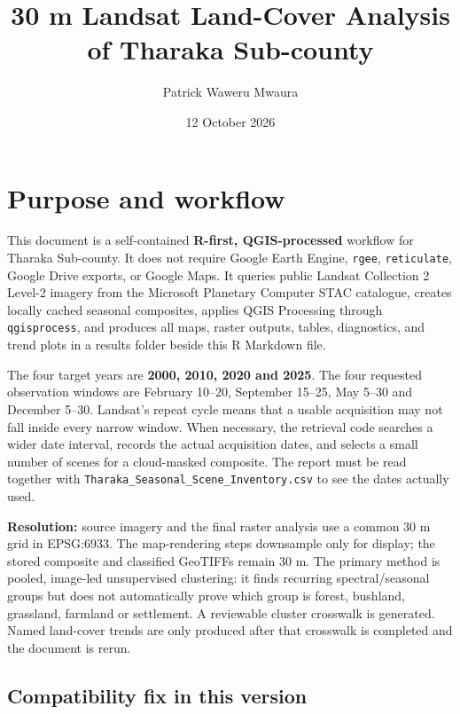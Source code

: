 \documentclass[
]{article}
\title{30 m Landsat Land-Cover Analysis of Tharaka Sub-county}
\author{Patrick Waweru Mwaura}
\date{12 October 2026}
\begin{document}
\maketitle

{
\setcounter{tocdepth}{2}
\tableofcontents
}
\section{Purpose and workflow}\label{purpose-and-workflow}

This document is a self-contained \textbf{R-first, QGIS-processed}
workflow for Tharaka Sub-county. It does not require Google Earth
Engine, \texttt{rgee}, \texttt{reticulate}, Google Drive exports, or
Google Maps. It queries public Landsat Collection 2 Level-2 imagery from
the Microsoft Planetary Computer STAC catalogue, creates locally cached
seasonal composites, applies QGIS Processing through
\texttt{qgisprocess}, and produces all maps, raster outputs, tables,
diagnostics, and trend plots in a results folder beside this R Markdown
file.

The four target years are \textbf{2000, 2010, 2020 and 2025}. The four
requested observation windows are February 10--20, September 15--25, May
5--30 and December 5--30. Landsat's repeat cycle means that a usable
acquisition may not fall inside every narrow window. When necessary, the
retrieval code searches a wider date interval, records the actual
acquisition dates, and selects a small number of scenes for a
cloud-masked composite. The report must be read together with
\texttt{Tharaka\_Seasonal\_Scene\_Inventory.csv} to see the dates
actually used.

\textbf{Resolution:} source imagery and the final raster analysis use a
common 30 m grid in EPSG:6933. The map-rendering steps downsample only
for display; the stored composite and classified GeoTIFFs remain 30 m.
The primary method is pooled, image-led unsupervised clustering: it
finds recurring spectral/seasonal groups but does not automatically
prove which group is forest, bushland, grassland, farmland or
settlement. A reviewable cluster crosswalk is generated. Named
land-cover trends are only produced after that crosswalk is completed
and the document is rerun.

\subsection{Compatibility fix in this
version}\label{compatibility-fix-in-this-version}
\end{document}
